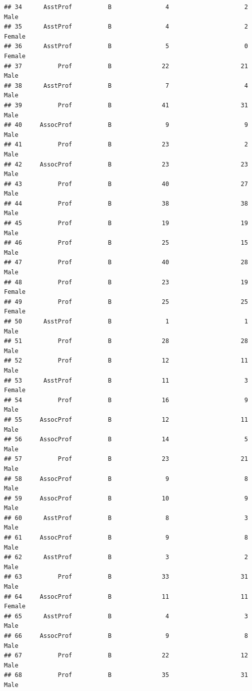 \documentclass[]{article}
\begin{document}
\begin{verbatim}
## 34      AsstProf          B               4                     2   Male
## 35      AsstProf          B               4                     2 Female
## 36      AsstProf          B               5                     0 Female
## 37          Prof          B              22                    21   Male
## 38      AsstProf          B               7                     4   Male
## 39          Prof          B              41                    31   Male
## 40     AssocProf          B               9                     9   Male
## 41          Prof          B              23                     2   Male
## 42     AssocProf          B              23                    23   Male
## 43          Prof          B              40                    27   Male
## 44          Prof          B              38                    38   Male
## 45          Prof          B              19                    19   Male
## 46          Prof          B              25                    15   Male
## 47          Prof          B              40                    28   Male
## 48          Prof          B              23                    19 Female
## 49          Prof          B              25                    25 Female
## 50      AsstProf          B               1                     1   Male
## 51          Prof          B              28                    28   Male
## 52          Prof          B              12                    11   Male
## 53      AsstProf          B              11                     3 Female
## 54          Prof          B              16                     9   Male
## 55     AssocProf          B              12                    11   Male
## 56     AssocProf          B              14                     5   Male
## 57          Prof          B              23                    21   Male
## 58     AssocProf          B               9                     8   Male
## 59     AssocProf          B              10                     9   Male
## 60      AsstProf          B               8                     3   Male
## 61     AssocProf          B               9                     8   Male
## 62      AsstProf          B               3                     2   Male
## 63          Prof          B              33                    31   Male
## 64     AssocProf          B              11                    11 Female
## 65      AsstProf          B               4                     3   Male
## 66     AssocProf          B               9                     8   Male
## 67          Prof          B              22                    12   Male
## 68          Prof          B              35                    31   Male

\end{verbatim}
\end{document}
